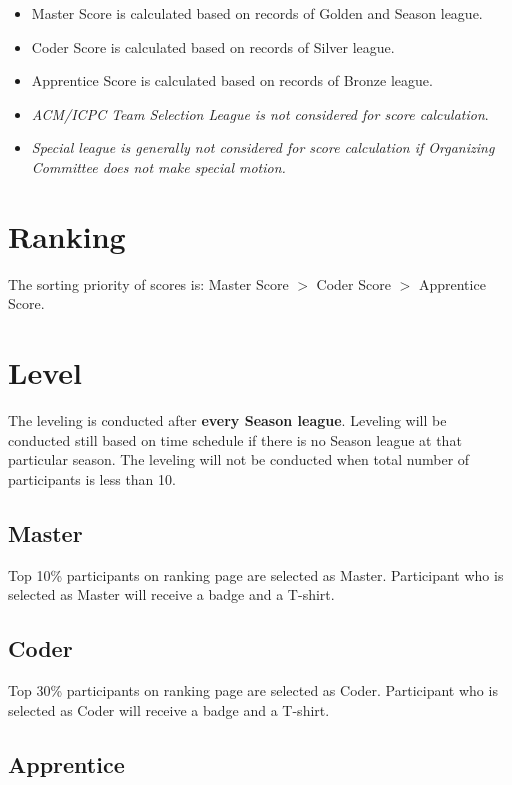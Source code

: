 \documentclass{article}
\begin{document}
\begin{itemize}
	\item Master Score is calculated based on records of Golden and Season league.
	\item Coder Score is calculated based on records of Silver league.
	\item Apprentice Score is calculated based on records of Bronze league.
	\item \emph{ACM/ICPC Team Selection League is not considered for score calculation}.
	\item \emph{Special league is generally not considered for score calculation if Organizing Committee does not make special motion.}
\end{itemize}

\section{Ranking}

The sorting priority of scores is: Master Score $>$ Coder Score $>$ Apprentice Score.

\section{Level}

The leveling is conducted after \textbf{every Season league}. Leveling will be conducted still based on time schedule if there is no Season league at that particular season. The leveling will not be conducted when total number of participants is less than 10.

\subsection{Master}

Top 10\% participants on ranking page are selected as Master. Participant who is selected as Master will receive a badge and a T-shirt.

\subsection{Coder}

Top 30\% participants on ranking page are selected as Coder. Participant who is selected as Coder will receive a badge and a T-shirt.

\subsection{Apprentice}
\end{document}

